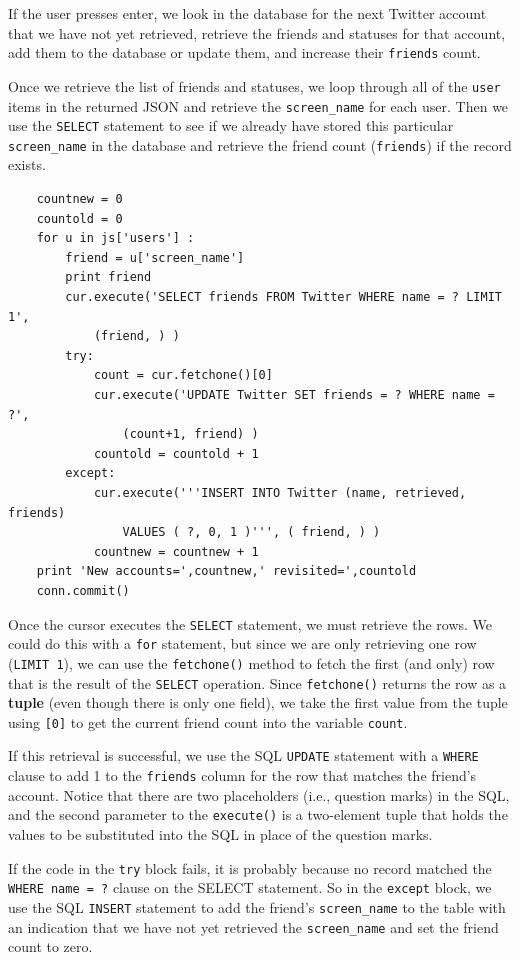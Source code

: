 If the user presses enter, we look in the database for the next 
Twitter account that we have not yet retrieved, retrieve the
friends and statuses for that account, add them to the database 
or update them, and increase their {\tt friends} count.

Once we retrieve the list of friends and statuses, we loop 
through all of the {\tt user} items in the returned JSON
and retrieve the \verb"screen_name" for each user.  Then we use
the {\tt SELECT} statement to see if we already have stored this
particular \verb"screen_name" in the database and retrieve the
friend count ({\tt friends}) if the record exists.

\beforeverb
\begin{verbatim}
    countnew = 0
    countold = 0
    for u in js['users'] :
        friend = u['screen_name']
        print friend
        cur.execute('SELECT friends FROM Twitter WHERE name = ? LIMIT 1', 
            (friend, ) )
        try:
            count = cur.fetchone()[0]
            cur.execute('UPDATE Twitter SET friends = ? WHERE name = ?', 
                (count+1, friend) )
            countold = countold + 1
        except:
            cur.execute('''INSERT INTO Twitter (name, retrieved, friends) 
                VALUES ( ?, 0, 1 )''', ( friend, ) )
            countnew = countnew + 1
    print 'New accounts=',countnew,' revisited=',countold
    conn.commit()
\end{verbatim}
\afterverb
%
Once the cursor executes the {\tt SELECT} statement, 
we must retrieve the rows.  We could do this with a {\tt for} 
statement, but since we are only retrieving
one row ({\tt LIMIT 1}), we can use the {\tt fetchone()} method to fetch the
first (and only) row that is the result of the {\tt SELECT} operation.  
Since {\tt fetchone()} returns the row as a {\bf tuple} (even though there is only
one field), we take the first value from the tuple using {\tt [0]} to get the 
current friend count into the variable {\tt count}.  

If this retrieval is successful, we use the SQL {\tt UPDATE} statement with a 
{\tt WHERE} clause to add 1 to the {\tt friends} column for the row that 
matches the friend's account.  Notice that there are two placeholders (i.e.,
question marks) in the SQL, and the second parameter to the {\tt execute()} is
a two-element tuple that holds the values to be substituted into the SQL
in place of the question marks.

If the code in the {\tt try} block fails, it is probably because no record
matched the {\tt WHERE name = ?} clause on the SELECT statement.  So in the
{\tt except} block, we use the SQL {\tt INSERT} statement to add the friend's
\verb"screen_name" to the table with an indication that we have not yet 
retrieved the \verb"screen_name" and set the friend count to zero.

